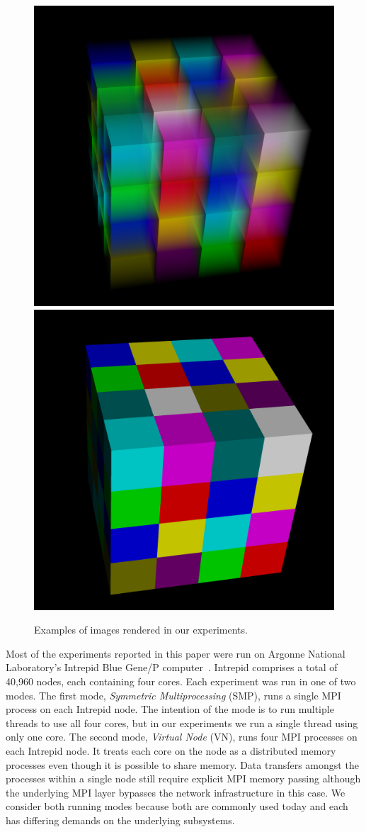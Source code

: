 \documentclass{acm_proc_article-sp}
\newcommand*{\lcite}[1]{~\cite{#1}}
\newcommand*{\keyterm}[1]{\emph{#1}}
\begin{document}
\begin{figure}[htbp]
  \centering
  \includegraphics[width=.4\linewidth]{images/TransparentOutput}
  \quad
  \includegraphics[width=.4\linewidth]{images/OpaqueOutput}
  \caption{Examples of images rendered in our experiments.}
  \label{fig:SimpleTimingOutput}
\end{figure}

Most of the experiments reported in this paper were run on Argonne National
Laboratory's Intrepid Blue Gene/P computer\lcite{BlueGeneP}.  Intrepid
comprises a total of 40,960 nodes, each containing four cores.  Each
experiment was run in one of two modes.  The first mode, \keyterm{Symmetric
Multiprocessing} (SMP), runs a single MPI process on each Intrepid
node.  The intention of the mode is to run multiple threads to use all four
cores, but in our experiments we run a single thread using only one core.
The second mode, \keyterm{Virtual Node} (VN), runs four MPI processes on
each Intrepid node.  It treats each core on the node as a distributed
memory processes even though it is possible to share memory.  Data
transfers amongst the processes within a single node still require explicit
MPI memory passing although the underlying MPI layer bypasses the network
infrastructure in this case.  We consider both running modes because both
are commonly used today and each has differing demands on the underlying
subsystems.

\end{document}
